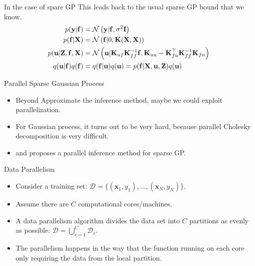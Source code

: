 \documentclass[14pt,aspectratio=1610]{beamer}
\newcommand{\yV}{\mathbf{y}}
\newcommand{\fV}{\mathbf{f}}
\newcommand{\xM}{\mathbf{X}}
\newcommand{\xV}{\mathbf{x}}
\newcommand{\K}{\mathbf{K}}
\newcommand{\uV}{\mathbf{u}}
\newcommand{\zM}{\mathbf{Z}}
\newcommand{\I}{\mathbf{I}}
\begin{document}
\begin{frame}{In the case of spare GP}
This leads back to the usual sparse GP bound that we know.
\begin{align*}
p(\yV| \fV) &= \gaussianDist{\yV}{\fV}{\sigma^2 \I} \\ 
p (\fV| \xM) &= \gaussianDist{\fV}{0}{\K(\xM, \xM)} \\
p(\uV| \zM, \fV, \xM) &= \gaussianDist{\uV}{\K_{uf} \K_{ff}^{-1}\fV}{\K_{uu} - \K_{fu}^\top \K_{ff}^{-1} \K_{fu}} \\
q(\uV | \fV) q(\fV) &= q(\fV | \uV) q(\uV) = p(\fV|\xM, \uV, \zM) q(\uV)
\end{align*}
\end{frame}


\begin{frame}{Parallel Sparse Gaussian Process}
\begin{itemize}
\item Beyond Approximate the inference method, maybe we could exploit parallelization.
\item For Gaussian process, it turns out to be very hard, because parallel Cholesky decomposition is very difficult.
\item \cite{DaiEtAl2014} and \cite{GalEtAl2014} proposes a parallel inference method for sparse GP.
\end{itemize}
\end{frame}

\begin{frame}{Data Parallelism}
\begin{itemize}
\item Consider a training set: $\mathcal{D} = \{(\xV_1, y_1), \ldots,  (\xV_N, y_N)\}$.
\item Assume there are $C$ computational cores/machines.
\item A data parallelism algorithm divides the data set into $C$ partitions as evenly as possible: $\mathcal{D} = \bigcup_{c=1}^C \mathcal{D}_c$.
\item The parallelism happens in the way that the function running on each core only requiring the data from the local partition.
\end{itemize}
\end{frame}
\end{document}
